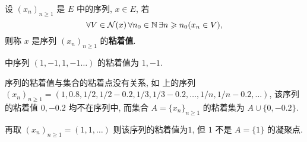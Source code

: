 \begin{Def}[序列的粘着值]\label{def:序列的粘着值}
      设 $ (x_{n})_{n\geqslant1} $ 是 $ E $ 中的序列,  $ x\in E $, 若
      \[
           \forall V\in\mathcal{N}(x)\,\forall n_{0}\in\mathbb{N}\,\exists n\geqslant n_{0}(x_{n}\in V),
      \]
      则称 $ x $ 是序列 $ (x_{n})_{n\geqslant1} $ 的\textbf{粘着值}.  
\end{Def}
\begin{Ex}
     \R 中序列 $ (1, -1, 1, -1\ldots) $ 的粘着值为 $ 1, -1 $.  
\end{Ex}
\begin{Rmk}
     序列的粘着值与集合的粘着点没有关系, 如 \R 上的序列 $ (x_{n})_{n\geqslant1}=(1, 0.8, {1}/{2}, {1}/{2}-0.2, {1}/{3}, {1}/{3}-0.2, \ldots, {1}/{n}, {1}/{n}-0.2, \ldots) $, 该序列的粘着值 $ 0, -0.2 $ 均不在序列中, 而集合 $ A=\{ x_{n} \}_{n\geqslant1} $ 的粘着集为 $ A\cup\{ 0,-0.2 \} $. 

     再取 $ (x_{n})_{n\geqslant1}=(1, 1, \ldots) $ 则该序列的粘着值为$1$,  但 $ 1 $ 不是 $ A=\{ 1 \} $ 的凝聚点.  
\end{Rmk}
